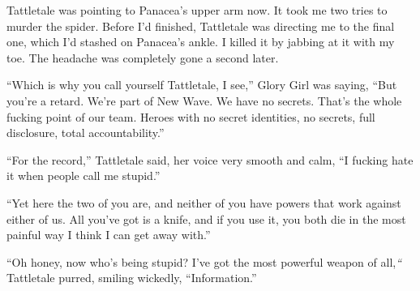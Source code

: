 Tattletale was pointing to Panacea's upper arm now.  It took me two tries to murder the spider.  Before I'd finished, Tattletale was directing me to the final one, which I'd stashed on Panacea's ankle. I killed it by jabbing at it with my toe.  The headache was completely gone a second later.



``Which is why you call yourself Tattletale, I see,'' Glory Girl was saying, ``But you're a retard.  We're part of New Wave.  We have no secrets.  That's the whole fucking point of our team.  Heroes with no secret identities, no secrets, full disclosure, total accountability.''



``For the record,'' Tattletale said, her voice very smooth and calm, ``I fucking hate it when people call me stupid.''



``Yet here the two of you are, and neither of you have powers that work against either of us.  All you've got is a knife, and if you use it, you both die in the most painful way I think I can get away with.''



``Oh honey, now who's being stupid?  I've got the most powerful weapon of all,\emph{``} Tattletale purred, smiling wickedly, ``Information.''

















